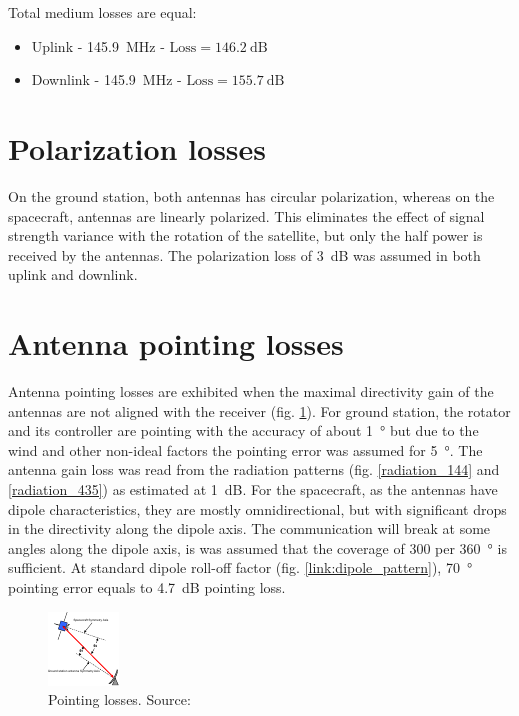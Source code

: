 \vspace{0.5cm}
Total medium losses are equal:
\begin{itemize}
    \item Uplink - \SI{145.9}{\MHz} - $\text{Loss} = \SI{146.2}{\dB}$
    \item Downlink - \SI{145.9}{\MHz} - $\text{Loss} = \SI{155.7}{\dB}$
\end{itemize}


\section{Polarization losses}
On the ground station, both antennas has circular polarization, whereas on the spacecraft, antennas are linearly polarized. This eliminates the effect of signal strength variance with the rotation of the satellite, but only the half power is received by the antennas. The polarization loss of \SI{3}{\dB} was assumed in both uplink and downlink.

\section{Antenna pointing losses}
Antenna pointing losses are exhibited when the maximal directivity gain of the antennas are not aligned with the receiver (fig. \ref{link:pointing_loss}). For ground station, the rotator and its controller are pointing with the accuracy of about \SI{1}{\degree} but due to the wind and other non-ideal factors the pointing error was assumed for \SI{5}{\degree}. The antenna gain loss was read from the radiation patterns (fig. \ref{radiation_144} and \ref{radiation_435}) as estimated at \SI{1}{\dB}. For the spacecraft, as the antennas have dipole characteristics, they are mostly omnidirectional, but with significant drops in the directivity along the dipole axis. The communication will break at some angles along the dipole axis, is was assumed that the coverage of \si{300} per \SI{360}{\degree} is sufficient. At standard dipole roll-off factor (fig. \ref{link:dipole_pattern}), \SI{70}{\degree} pointing error equals to \SI{4.7}{\dB} pointing loss.

\begin{figure}
    \centering
    \includegraphics[width=0.5\paperwidth]{img/8/pointing_loss.pdf}
    \caption{Pointing losses. Source: \cite{amsat_link_budget}}
    \label{link:pointing_loss}
\end{figure}

